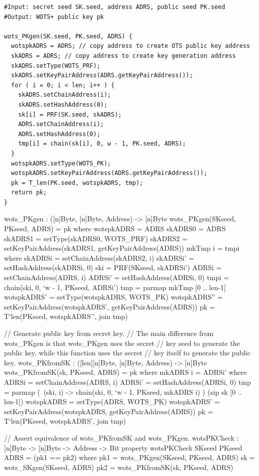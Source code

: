 \begin{lstlisting}[label=alg:wots_pkgen, language=pseudoc,
                   caption=\texttt{wots\_PKgen} -- Generating a \wotsp public key.]
#Input: secret seed SK.seed, address ADRS, public seed PK.seed
#Output: WOTS+ public key pk

wots_PKgen(SK.seed, PK.seed, ADRS) {
  wotspkADRS = ADRS; // copy address to create OTS public key address
  skADRS = ADRS; // copy address to create key generation address
  skADRS.setType(WOTS_PRF);
  skADRS.setKeyPairAddress(ADRS.getKeyPairAddress());
  for ( i = 0; i < len; i++ ) {
    skADRS.setChainAddress(i);
    skADRS.setHashAddress(0);
    sk[i] = PRF(SK.seed, skADRS);
    ADRS.setChainAddress(i);
    ADRS.setHashAddress(0);
    tmp[i] = chain(sk[i], 0, w - 1, PK.seed, ADRS);
  }
  wotspkADRS.setType(WOTS_PK);
  wotspkADRS.setKeyPairAddress(ADRS.getKeyPairAddress());
  pk = T_len(PK.seed, wotspkADRS, tmp);
  return pk;
} 
\end{lstlisting} 

\begin{code}
  wots_PKgen : ([n]Byte, [n]Byte, Address) -> [n]Byte
  wots_PKgen(SKseed, PKseed, ADRS) = pk where
    wotspkADRS = ADRS
    skADRS0 = ADRS
    skADRS1 = setType(skADRS0, WOTS_PRF)
    skADRS2 = setKeyPairAddress(skADRS1, getKeyPairAddress(ADRS))
    mkTmp i = tmpi where
      skADRSi = setChainAddress(skADRS2, i)
      skADRSi' = setHashAddress(skADRSi, 0)
      ski = PRF(SKseed, skADRSi')
      ADRSi = setChainAddress(ADRS, i)
      ADRSi' = setHashAddress(ADRSi, 0)
      tmpi = chain(ski, 0, `w - 1, PKseed, ADRSi')
    tmp = parmap mkTmp [0 .. len-1]
    wotspkADRS' = setType(wotspkADRS, WOTS_PK)
    wotspkADRS'' = setKeyPairAddress(wotspkADRS', getKeyPairAddress(ADRS))
    pk = T`{len}(PKseed, wotspkADRS'', join tmp)

  // Generate public key from secret key.
  // The main difference from wots_PKgen is that wots_PKgen uses the secret
  // key seed to generate the public key, while this function uses the secret
  // key itself to generate the public key.
  wots_PKfromSK : ([len][n]Byte, [n]Byte, Address) -> [n]Byte
  wots_PKfromSK(sk, PKseed, ADRS) = pk where
    mkADRS i = ADRSi' where
      ADRSi = setChainAddress(ADRS, i)
      ADRSi' = setHashAddress(ADRSi, 0)
    tmp = parmap (\ (ski, i) -> chain(ski, 0, `w - 1, PKseed, mkADRS i) )
                 (zip sk [0 .. len-1])
    wotspkADRS = setType(ADRS, WOTS_PK)
    wotspkADRS' = setKeyPairAddress(wotspkADRS, getKeyPairAddress(ADRS))
    pk = T`{len}(PKseed, wotspkADRS', join tmp)

  // Assert equivalence of wots_PKfromSK and wots_PKgen.
  wotsPKCheck : [n]Byte -> [n]Byte -> Address -> Bit
  property wotsPKCheck SKseed PKseed ADRS = (pk1 == pk2) where
    pk1 = wots_PKgen(SKseed, PKseed, ADRS)
    sk = wots_SKgen(SKseed, ADRS)
    pk2 = wots_PKfromSK(sk, PKseed, ADRS)
\end{code}

